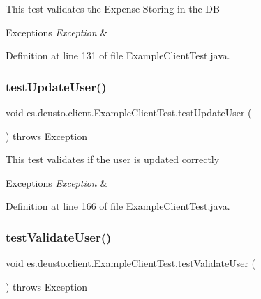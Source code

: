 This test validates the Expense Storing in the DB 
\begin{DoxyExceptions}{Exceptions}
{\em Exception} & \\
\hline
\end{DoxyExceptions}


Definition at line 131 of file Example\+Client\+Test.\+java.

\mbox{\label{classes_1_1deusto_1_1client_1_1_example_client_test_a56744195ae10c2d3e4763fcf4511aae7}} 
\subsubsection{\texorpdfstring{test\+Update\+User()}{testUpdateUser()}}
{\footnotesize\ttfamily void es.\+deusto.\+client.\+Example\+Client\+Test.\+test\+Update\+User (\begin{DoxyParamCaption}{ }\end{DoxyParamCaption}) throws Exception}

This test validates if the user is updated correctly 
\begin{DoxyExceptions}{Exceptions}
{\em Exception} & \\
\hline
\end{DoxyExceptions}


Definition at line 166 of file Example\+Client\+Test.\+java.

\mbox{\label{classes_1_1deusto_1_1client_1_1_example_client_test_a811ff9955188b9cc3cbb4120f7bad542}} 
\subsubsection{\texorpdfstring{test\+Validate\+User()}{testValidateUser()}}
{\footnotesize\ttfamily void es.\+deusto.\+client.\+Example\+Client\+Test.\+test\+Validate\+User (\begin{DoxyParamCaption}{ }\end{DoxyParamCaption}) throws Exception}


